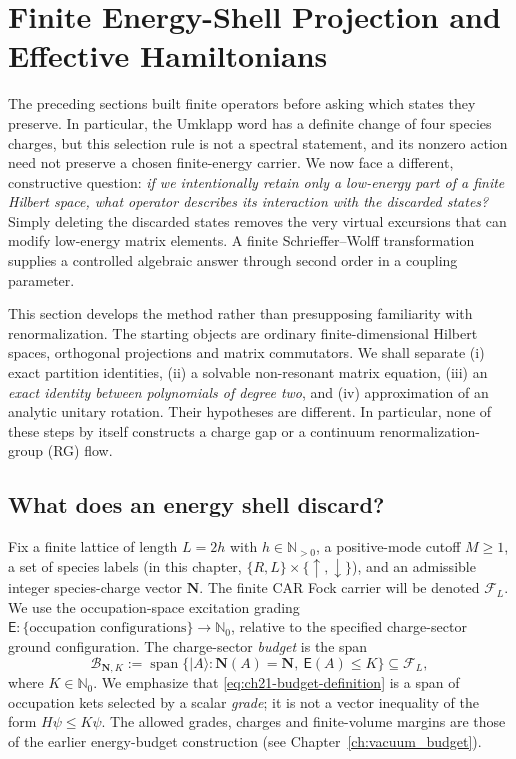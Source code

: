 \section{Finite Energy-Shell Projection and Effective Hamiltonians}
\label{sec:ch21-finite-effective}

The preceding sections built finite operators before asking which states they
preserve.  In particular, the Umklapp word has a definite change of four
species charges, but this selection rule is not a spectral statement, and its
nonzero action need not preserve a chosen finite-energy carrier.  We now face
a different, constructive question: \emph{if we intentionally retain only a
low-energy part of a finite Hilbert space, what operator describes its
interaction with the discarded states?}  Simply deleting the discarded
states removes the very virtual excursions that can modify low-energy
matrix elements.  A finite Schrieffer--Wolff transformation supplies a
controlled algebraic answer through second order in a coupling parameter.

This section develops the method rather than presupposing familiarity with
renormalization.  The starting objects are ordinary finite-dimensional
Hilbert spaces, orthogonal projections and matrix commutators.  We shall
separate (i) exact partition identities, (ii) a solvable non-resonant matrix
equation, (iii) an \emph{exact identity between polynomials of degree two},
and (iv) approximation of an analytic unitary rotation.  Their hypotheses
are different.  In particular, none of these steps by itself constructs a
charge gap or a continuum renormalization-group (RG) flow.

\subsection{What does an energy shell discard?}
\label{subsec:ch21-energy-shell}

Fix a finite lattice of length $L=2h$ with $h\in\mathbb N_{>0}$, a
positive-mode cutoff $M\geq1$, a set of species labels (in this chapter,
$\{R,L\}\times\{\uparrow,\downarrow\}$), and an admissible integer
species-charge vector $\boldsymbol N$.  The finite CAR Fock carrier will be
denoted $\mathcal F_L$.  We use the occupation-space excitation grading
$\mathsf E\colon\{\text{occupation configurations}\}\to\mathbb N_0$,
relative to the specified charge-sector ground configuration.  The
charge-sector \emph{budget} is the span
\begin{equation}
\mathcal B_{\boldsymbol N,K}
 :=\operatorname{span}\bigl\{\lvert A\rangle:
 \boldsymbol N(A)=\boldsymbol N,\ \mathsf E(A)\leq K\bigr\}
 \subseteq\mathcal F_L,
\label{eq:ch21-budget-definition}
\end{equation}
where $K\in\mathbb N_0$.  We emphasize that \eqref{eq:ch21-budget-definition}
is a span of occupation kets selected by a scalar \emph{grade}; it is not
a vector inequality of the form $H\psi\leq K\psi$.  The allowed grades,
charges and finite-volume margins are those of the earlier energy-budget
construction (see Chapter~\ref{ch:vacuum_budget}).

